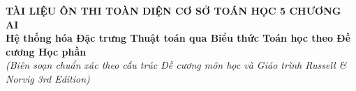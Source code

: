 \documentclass[../main.tex]{subfiles}
\begin{document}

\begin{center}
    \textbf{\LARGE TÀI LIỆU ÔN THI TOÀN DIỆN CƠ SỞ TOÁN HỌC 5 CHƯƠNG AI} \\
    \vspace{0.2cm}
    \textbf{\large Hệ thống hóa Đặc trưng Thuật toán qua Biểu thức Toán học theo Đề cương Học phần} \\
    \textit{(Biên soạn chuẩn xác theo cấu trúc Đề cương môn học và Giáo trình Russell \& Norvig 3rd Edition)}
\end{center}

\vspace{0.5cm}
\end{document}
